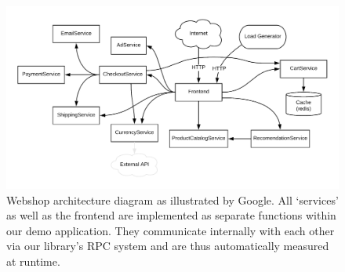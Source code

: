 \documentclass[../main.tex]{subfiles}
\begin{document}
\begin{figure}
\begin{center}
  \includegraphics[width=\linewidth,keepaspectratio]{./webshop-architecture-diagram.png}
\end{center}
\caption[Webshop Architecture Diagram]{%
  Webshop architecture diagram as illustrated by Google\protect\footnotemark.
  All `services' as well as the frontend are implemented as separate functions within our demo application. 
  They communicate internally with each other via our library's RPC system and are thus automatically measured at runtime.%
}%
\label{fig:webshopArchitectureDiagram}
\end{figure}
\end{document}
